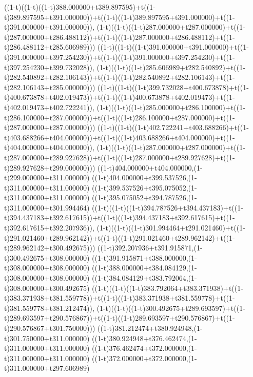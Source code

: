 ((1-t)((1-t)((1-t)388.000000+t389.897595)+t((1-t)389.897595+t391.000000))+t((1-t)((1-t)389.897595+t391.000000)+t((1-t)391.000000+t391.000000)),                                     (1-t)((1-t)((1-t)287.000000+t287.000000)+t((1-t)287.000000+t286.488112))+t((1-t)((1-t)287.000000+t286.488112)+t((1-t)286.488112+t285.606989)))
((1-t)((1-t)((1-t)391.000000+t391.000000)+t((1-t)391.000000+t397.254230))+t((1-t)((1-t)391.000000+t397.254230)+t((1-t)397.254230+t399.732028)),                                     (1-t)((1-t)((1-t)285.606989+t282.540892)+t((1-t)282.540892+t282.106143))+t((1-t)((1-t)282.540892+t282.106143)+t((1-t)282.106143+t285.000000)))
((1-t)((1-t)((1-t)399.732028+t400.673878)+t((1-t)400.673878+t402.019473))+t((1-t)((1-t)400.673878+t402.019473)+t((1-t)402.019473+t402.722241)),                                     (1-t)((1-t)((1-t)285.000000+t286.100000)+t((1-t)286.100000+t287.000000))+t((1-t)((1-t)286.100000+t287.000000)+t((1-t)287.000000+t287.000000)))
((1-t)((1-t)((1-t)402.722241+t403.688266)+t((1-t)403.688266+t404.000000))+t((1-t)((1-t)403.688266+t404.000000)+t((1-t)404.000000+t404.000000)),                                     (1-t)((1-t)((1-t)287.000000+t287.000000)+t((1-t)287.000000+t289.927628))+t((1-t)((1-t)287.000000+t289.927628)+t((1-t)289.927628+t299.000000)))
((1-t)404.000000+t404.000000,(1-t)299.000000+t311.000000)
((1-t)404.000000+t399.537526,(1-t)311.000000+t311.000000)
((1-t)399.537526+t395.075052,(1-t)311.000000+t311.000000)
((1-t)395.075052+t394.787526,(1-t)311.000000+t301.994464)
((1-t)((1-t)((1-t)394.787526+t394.437183)+t((1-t)394.437183+t392.617615))+t((1-t)((1-t)394.437183+t392.617615)+t((1-t)392.617615+t392.207936)),                                     (1-t)((1-t)((1-t)301.994464+t291.021460)+t((1-t)291.021460+t289.962142))+t((1-t)((1-t)291.021460+t289.962142)+t((1-t)289.962142+t300.492675)))
((1-t)392.207936+t391.915871,(1-t)300.492675+t308.000000)
((1-t)391.915871+t388.000000,(1-t)308.000000+t308.000000)
((1-t)388.000000+t384.084129,(1-t)308.000000+t308.000000)
((1-t)384.084129+t383.792064,(1-t)308.000000+t300.492675)
((1-t)((1-t)((1-t)383.792064+t383.371938)+t((1-t)383.371938+t381.559778))+t((1-t)((1-t)383.371938+t381.559778)+t((1-t)381.559778+t381.212474)),                                     (1-t)((1-t)((1-t)300.492675+t289.693597)+t((1-t)289.693597+t290.576867))+t((1-t)((1-t)289.693597+t290.576867)+t((1-t)290.576867+t301.750000)))
((1-t)381.212474+t380.924948,(1-t)301.750000+t311.000000)
((1-t)380.924948+t376.462474,(1-t)311.000000+t311.000000)
((1-t)376.462474+t372.000000,(1-t)311.000000+t311.000000)
((1-t)372.000000+t372.000000,(1-t)311.000000+t297.606989)
